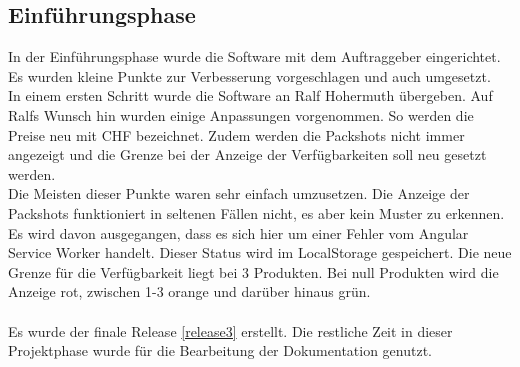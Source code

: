  \subsection{Einführungsphase}
 In der Einführungsphase wurde die Software mit dem Auftraggeber eingerichtet. Es wurden kleine Punkte zur Verbesserung vorgeschlagen und auch umgesetzt. \\
 In einem ersten Schritt wurde die Software an Ralf Hohermuth übergeben. Auf Ralfs Wunsch hin wurden einige Anpassungen vorgenommen. So werden die Preise neu mit CHF bezeichnet. Zudem werden die Packshots nicht immer angezeigt und die Grenze bei der Anzeige der Verfügbarkeiten soll neu gesetzt werden. \\
 Die Meisten dieser Punkte waren sehr einfach umzusetzen. Die Anzeige der Packshots funktioniert in seltenen Fällen nicht, es aber kein Muster zu erkennen. Es wird davon ausgegangen, dass es sich hier um einer Fehler vom Angular Service Worker handelt. Dieser Status wird im \gls{LocalStorage} gespeichert. Die neue Grenze für die Verfügbarkeit liegt bei 3 Produkten. Bei null Produkten wird die Anzeige rot, zwischen 1-3 orange und darüber hinaus grün. \\\\
 Es wurde der finale Release \ref{release3} erstellt. Die restliche Zeit in dieser Projektphase wurde für die Bearbeitung der Dokumentation genutzt. 


\newpage
